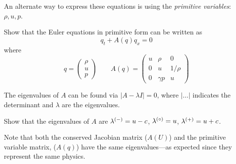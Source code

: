An alternate way to express these equations is using the {\em
  primitive variables}: $\rho, u, p$.
\begin{exercise}
{Show that the Euler equations in primitive form can
  be written as
\begin{equation}
q_t + A(q) q_x = 0
\end{equation}
where
\begin{equation}
q = \left ( \begin{array}{c} \rho \\ u \\ p \end{array} \right )
%
\qquad
A(q) = \left ( \begin{array}{ccc} u  & \rho     & 0 \\
                                  0  &  u       & 1/\rho \\
                                  0  & \gamma p & u \end{array} \right )
\end{equation}
}
\end{exercise}
%
The eigenvalues of $A$ can be found via $| A - \lambda I | = 0$,
where $|\ldots|$ indicates the determinant and $\lambda$ are the eigenvalues.
\begin{exercise}
{
Show that the eigenvalues of $A$ are $\lambda^{(-)} = u -c$, $\lambda^{(\circ)} = u$, $\lambda^{(+)} = u+c$.
}
\end{exercise}
Note that both the conserved Jacobian matrix ($A(U)$) and the primitive 
variable matrix, ($A(q)$) have the same eigenvalues---as expected since
they represent the same physics.

